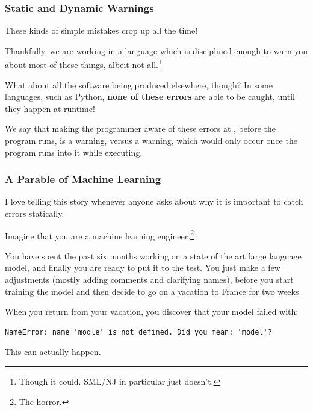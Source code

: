 \documentclass[aspectratio=169, handout]{beamer}
\begin{document}
\begin{frame}[fragile]
  \frametitle{Static and Dynamic Warnings}

  These kinds of simple mistakes crop up all the time!

  \pause
  \vspace{\fill}

  Thankfully, we are working in a language which is disciplined enough
  to warn you about most of these things, albeit not all.\footnote{Though it could.
  SML/NJ in particular just doesn't.}

  \pause
  \vspace{\fill}

  What about all the software being produced elsewhere, though? In some languages,
  such as Python, \textbf{none of these errors} are able to be caught, until they
  happen at runtime!

  \pause
  \vspace{\fill}

  We say that making the programmer aware of these errors at ,
  before the program runs, is a  warning, versus a 
  warning, which would only occur once the program runs into it while executing.
\end{frame}

\begin{frame}[fragile]
  \frametitle{A Parable of Machine Learning}

  I love telling this story whenever anyone asks about why it is important
  to catch errors statically.

  \pause
  \vspace{\fill}

  Imagine that you are a machine learning engineer.\footnote{The horror.}

  \pause
  \vspace{\fill}

  You have spent the past six months working on a state of the art large
  language model, and finally you are ready to put it to the test. You just
  make a few adjustments (mostly adding comments and clarifying names),
  before you start training the model and then decide to go on a vacation to France for
  two weeks.

  \pause
  \vspace{\fill}

  When you return from your vacation, you discover that your model failed
  with:
  {\small
  \begin{lstlisting}[style=15150code, numbers=none]
    NameError: name 'modle' is not defined. Did you mean: 'model'?
  \end{lstlisting}
  }

  \pause
  \vspace{\fill}

  This can actually happen.
\end{frame}
\end{document}
